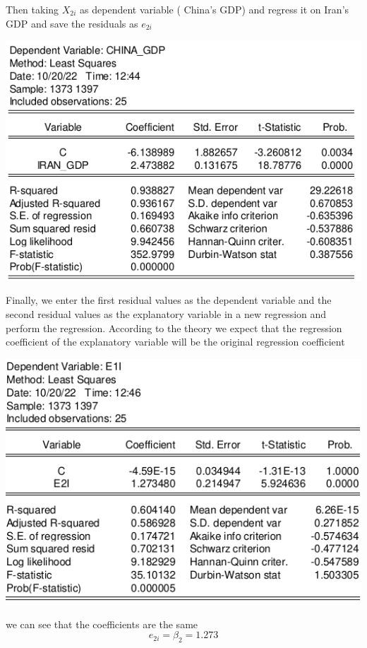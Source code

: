 \documentclass[12pt, letterpaper, twoside]{article}
\begin{document}
Then taking \(X_{2i}\) as dependent variable ( China’s GDP) and regress it on Iran’s GDP and save the residuals as \(e_{2i}\)

    \includegraphics[width=.8\textwidth,height=.8\textwidth,keepaspectratio,center]{3.png}

Finally, we enter the first residual values as the dependent variable and the second residual values‬ as the explanatory variable in a new regression and perform the regression. According to the theory we expect that the regression coefficient of the explanatory variable will be the original regression coefficient

    \includegraphics[width=.6\textwidth,height=.6\textwidth,keepaspectratio,center]{4.png}

we can see that the coefficients are the same
\[e_{2i}=\beta_{2}=1.273\]
\end{document}

